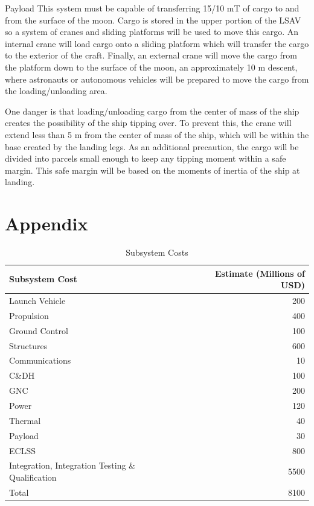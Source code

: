 \documentclass[10pt]{article}
\begin{document}
Payload This system must be capable of transferring 15/10 mT of cargo
to and from the surface of the moon. Cargo is stored in the upper
portion of the LSAV so a system of cranes and sliding platforms will
be used to move this cargo. An internal crane will load cargo onto a
sliding platform which will transfer the cargo to the exterior of the
craft. Finally, an external crane will move the cargo from the
platform down to the surface of the moon, an approximately 10 m
descent, where astronauts or autonomous vehicles will be prepared to
move the cargo from the loading/unloading area.

One danger is that loading/unloading cargo from the center of mass of
the ship creates the possibility of the ship tipping over. To prevent
this, the crane will extend less than 5 m from the center of mass of
the ship, which will be within the base created by the landing
legs. As an additional precaution, the cargo will be divided into
parcels small enough to keep any tipping moment within a safe
margin. This safe margin will be based on the moments of inertia of
the ship at landing.


\newpage

\section{Appendix}

\begin{table}[H]
  \centering
  \caption{Subsystem Costs}
  \begin{tabular}{p{2in}r} 
    Subsystem Cost & Estimate (Millions of USD) \\ \hline
    Launch Vehicle & 200 \\
    Propulsion & 400 \\
    Ground Control & 100 \\
    Structures & 600 \\
    Communications & 10 \\
    C\&DH & 100 \\
    GNC & 200 \\
    Power & 120 \\
    Thermal & 40 \\
    Payload & 30 \\
    ECLSS & 800 \\ \hline
    Integration, Integration Testing \& Qualification & 5500 \\ \hline
    Total & 8100 \\
  \end{tabular}
\end{table}
\end{document}
